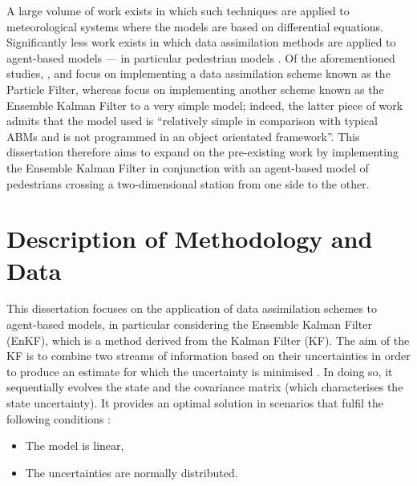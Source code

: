 \documentclass[12pt, twoside, a4paper]{article}
\begin{document}
A large volume of work exists in which such techniques are applied to
meteorological systems where the models are based on differential equations.
Significantly less work exists in which data assimilation methods are applied to
agent-based models \citep{wang2017random} --- in particular pedestrian models
\citep{wang2013data, rai2013behavior, wang2015data, ward2016dynamic}.
Of the aforementioned studies, \citet{wang2013data}, \citet{rai2013behavior} and
\citet{wang2015data} focus on implementing a data assimilation scheme known as
the Particle Filter, whereas \citet{ward2016dynamic} focus on implementing
another scheme known as the Ensemble Kalman Filter to a very simple model;
indeed, the latter piece of work admits that the model used is ``relatively
simple in comparison with typical ABMs and is not programmed in an object
orientated framework''.
This dissertation therefore aims to expand on the pre-existing work by
implementing the Ensemble Kalman Filter in conjunction with an agent-based model
of pedestrians crossing a two-dimensional station from one side to the other.

\section{Description of Methodology and Data}\label{sec:method_descr}



This dissertation focuses on the application of data assimilation schemes to
agent-based models, in particular considering the Ensemble Kalman Filter (EnKF),
which is a method derived from the Kalman Filter (KF).
The aim of the KF is to combine two streams of information based on their
uncertainties in order to produce an estimate for which the uncertainty is
minimised \citep{kalman1960new}.
In doing so, it sequentially evolves the state and the covariance matrix (which
characterises the state uncertainty).
It provides an optimal solution in scenarios that fulfil the following
conditions \citep{mandel2009brief}:
\begin{itemize}
    \item The model is linear,
    \item The uncertainties are normally distributed.
\end{itemize}
\end{document}
